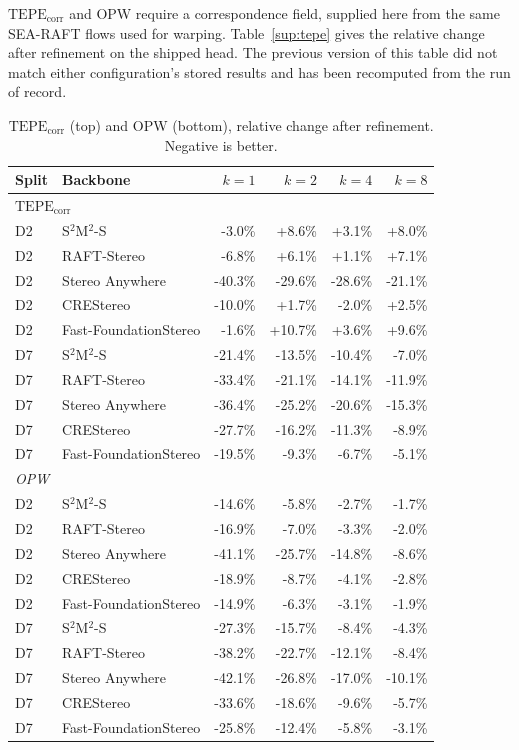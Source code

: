\documentclass[letterpaper,10pt,conference]{ieeeconf}
\newcommand{\TEPE}{\mathrm{TEPE}}
\begin{document}
$\TEPE_{\mathrm{corr}}$ and OPW require a correspondence field, supplied
here from the same SEA-RAFT flows used for warping. Table~\ref{sup:tepe}
gives the relative change after refinement on the shipped head. The previous
version of this table did not match either configuration's stored results and
has been recomputed from the run of record.

\begin{table}[htb]
\centering
\small
\caption{$\TEPE_{\mathrm{corr}}$ (top) and OPW (bottom), relative change
after refinement. Negative is better.}
\label{sup:tepetab}
\begin{tabular}{llrrrr}
\toprule
Split & Backbone & $k{=}1$ & $k{=}2$ & $k{=}4$ & $k{=}8$ \\
\midrule
\multicolumn{6}{l}{\emph{$\TEPE_{\mathrm{corr}}$}}\\
D2 & S$^2$M$^2$-S          &  -3.0\% &  +8.6\% &  +3.1\% &  +8.0\% \\
D2 & RAFT-Stereo           &  -6.8\% &  +6.1\% &  +1.1\% &  +7.1\% \\
D2 & Stereo Anywhere       & -40.3\% & -29.6\% & -28.6\% & -21.1\% \\
D2 & CREStereo             & -10.0\% &  +1.7\% &  -2.0\% &  +2.5\% \\
D2 & Fast-FoundationStereo &  -1.6\% & +10.7\% &  +3.6\% &  +9.6\% \\
D7 & S$^2$M$^2$-S          & -21.4\% & -13.5\% & -10.4\% &  -7.0\% \\
D7 & RAFT-Stereo           & -33.4\% & -21.1\% & -14.1\% & -11.9\% \\
D7 & Stereo Anywhere       & -36.4\% & -25.2\% & -20.6\% & -15.3\% \\
D7 & CREStereo             & -27.7\% & -16.2\% & -11.3\% &  -8.9\% \\
D7 & Fast-FoundationStereo & -19.5\% &  -9.3\% &  -6.7\% &  -5.1\% \\
\midrule
\multicolumn{6}{l}{\emph{OPW}}\\
D2 & S$^2$M$^2$-S          & -14.6\% &  -5.8\% &  -2.7\% &  -1.7\% \\
D2 & RAFT-Stereo           & -16.9\% &  -7.0\% &  -3.3\% &  -2.0\% \\
D2 & Stereo Anywhere       & -41.1\% & -25.7\% & -14.8\% &  -8.6\% \\
D2 & CREStereo             & -18.9\% &  -8.7\% &  -4.1\% &  -2.8\% \\
D2 & Fast-FoundationStereo & -14.9\% &  -6.3\% &  -3.1\% &  -1.9\% \\
D7 & S$^2$M$^2$-S          & -27.3\% & -15.7\% &  -8.4\% &  -4.3\% \\
D7 & RAFT-Stereo           & -38.2\% & -22.7\% & -12.1\% &  -8.4\% \\
D7 & Stereo Anywhere       & -42.1\% & -26.8\% & -17.0\% & -10.1\% \\
D7 & CREStereo             & -33.6\% & -18.6\% &  -9.6\% &  -5.7\% \\
D7 & Fast-FoundationStereo & -25.8\% & -12.4\% &  -5.8\% &  -3.1\% \\
\bottomrule
\end{tabular}
\end{table}
\end{document}

